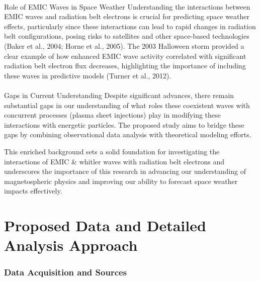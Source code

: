 \documentclass[
  letterpaper,
  DIV=11,
  numbers=noendperiod]{scrartcl}
\makeatletter
\let\oldparagraph\paragraph
\renewcommand{\paragraph}{
    \@ifstar
      \xxxParagraphStar
      \xxxParagraphNoStar
  }
\newcommand{\xxxParagraphStar}[1]{\oldparagraph*{#1}\mbox{}}
\newcommand{\xxxParagraphNoStar}[1]{\oldparagraph{#1}\mbox{}}
\makeatother
\begin{document}
\paragraph{Role of EMIC Waves in Space Weather}\label{role-of-emic-waves-in-space-weather}
Understanding the interactions between EMIC waves and radiation belt electrons is crucial for predicting space weather effects, particularly since these interactions can lead to rapid changes in radiation belt configurations, posing risks to satellites and other space-based technologies (Baker et al., 2004; Horne et al., 2005). The 2003 Halloween storm provided a clear example of how enhanced EMIC wave activity correlated with significant radiation belt electron flux decreases, highlighting the importance of including these waves in predictive models (Turner et al., 2012).

\paragraph{Gaps in Current Understanding}\label{gaps-in-current-understanding}
Despite significant advances, there remain substantial gaps in our understanding of what roles these coexistent waves with concurrent processes (plasma sheet injections) play in modifying these interactions with energetic particles. The proposed study aims to bridge these gaps by combining observational data analysis with theoretical modeling efforts.

This enriched background sets a solid foundation for investigating the interactions of EMIC \& whitler waves with radiation belt electrons and underscores the importance of this research in advancing our understanding of magnetospheric physics and improving our ability to forecast space weather impacts effectively.

\section{Proposed Data and Detailed Analysis Approach}\label{proposed-data-and-detailed-analysis-approach}

\subsubsection{Data Acquisition and Sources}\label{data-acquisition-and-sources}
\end{document}
